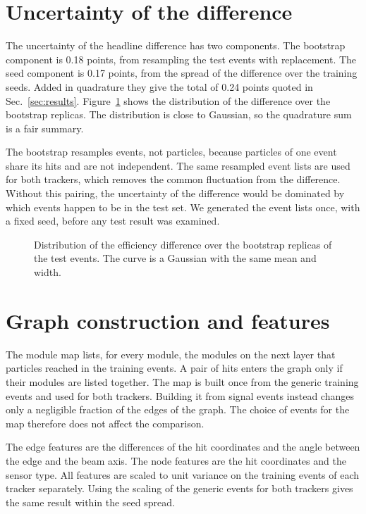\section{Uncertainty of the difference}
\label{app:stat}

The uncertainty of the headline difference has two components.
The bootstrap component is 0.18 points, from resampling the test events with replacement.
The seed component is 0.17 points, from the spread of the difference over the training seeds.
Added in quadrature they give the total of 0.24 points quoted in Sec.~\ref{sec:results}.
Figure~\ref{fig:bootstrap} shows the distribution of the difference over the bootstrap replicas.
The distribution is close to Gaussian, so the quadrature sum is a fair summary.

The bootstrap resamples events, not particles, because particles of one event share its hits and are not independent.
The same resampled event lists are used for both trackers, which removes the common fluctuation from the difference.
Without this pairing, the uncertainty of the difference would be dominated by which events happen to be in the test set.
We generated the event lists once, with a fixed seed, before any test result was examined.

\begin{figure}[tbp]
  \centering
  \caption{Distribution of the efficiency difference over the bootstrap replicas of the test events. The curve is a Gaussian with the same mean and width.}
  \label{fig:bootstrap}
\end{figure}

\section{Graph construction and features}
\label{app:graph}

The module map lists, for every module, the modules on the next layer that particles reached in the training events.
A pair of hits enters the graph only if their modules are listed together.
The map is built once from the generic training events and used for both trackers.
Building it from signal events instead changes only a negligible fraction of the edges of the graph.
The choice of events for the map therefore does not affect the comparison.

The edge features are the differences of the hit coordinates and the angle between the edge and the beam axis.
The node features are the hit coordinates and the sensor type.
All features are scaled to unit variance on the training events of each tracker separately.
Using the scaling of the generic events for both trackers gives the same result within the seed spread.

